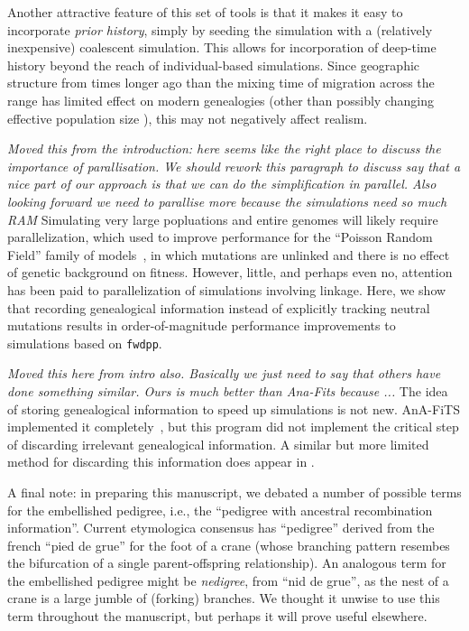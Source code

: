 \documentclass{article}
\newcommand{\fwdpp}{\texttt{fwdpp}}
\newcommand{\jk}[1]{{\em \color{red} #1}}
\begin{document}
Another attractive feature of this set of tools
is that it makes it easy to incorporate \emph{prior history},
simply by seeding the simulation with a (relatively inexpensive) coalescent simulation.
This allows for incorporation of deep-time history beyond the reach of individual-based simulations.
Since geographic structure from times longer ago than the mixing
time of migration across the range has limited effect on modern genealogies
\citep{wilkins2004separation} (other than possibly changing effective population
size \citet{barton2002neutral,cox2002stepping}), this may not negatively affect realism.

\jk{Moved this from the introduction: here seems like the right place to
discuss the importance of parallisation. We should rework this paragraph to
discuss say that a nice part of our approach is that we can do the
simplification in parallel. Also looking forward we need to parallise more
because the simulations need so much RAM}
Simulating very large popluations and entire genomes will likely require parallelization,
which \cite{lawrie2017accelerating} used to improve
performance for the ``Poisson Random Field'' family of models~\citep{Sawyer1992-jw},
in which mutations are unlinked and there is no
effect of genetic background on fitness.  However, little, and perhaps even no, attention has been paid to
parallelization of simulations involving linkage.  Here, we show that recording genealogical information instead of
explicitly tracking neutral mutations results in order-of-magnitude performance improvements to simulations based on
\fwdpp{}.

\jk{Moved this here from intro also. Basically we just need to say that others
have done something similar. Ours is much better than Ana-Fits because ...}
The  idea of storing genealogical information to speed up simulations is not new.  AnA-FiTS implemented it
completely~\citep{aberer2013rapid}, but this program did not implement the critical step of
discarding irrelevant genealogical information.  A similar but more limited method for
discarding this information does appear in \citet{padhukasahasram2008exploring}.

A final note:
in preparing this manuscript,
we debated a number of possible terms for the embellished pedigree,
i.e., the ``pedigree with ancestral recombination information''.
Current etymologica consensus \citep{liberman2014little} has
``pedigree'' derived from the french ``pied de grue'' for the foot of a crane
(whose branching pattern resembes the bifurcation of a single parent-offspring relationship).
An analogous term for the embellished pedigree might be \emph{nedigree},
from ``nid de grue'',
as the nest of a crane is a large jumble of (forking) branches.
We thought it unwise to use this term throughout the manuscript,
but perhaps it will prove useful elsewhere.
\end{document}
